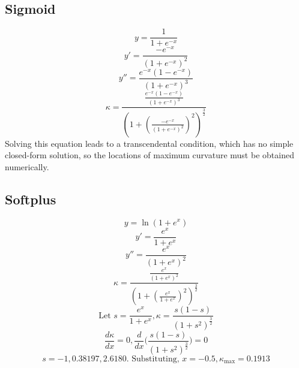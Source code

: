 \documentclass{article}
\begin{document}
\subsection{Sigmoid}\label{app:sigmoid}

\begin{displaymath}
  y = \frac{1}{1 + e^{-x}}
\end{displaymath}
\begin{displaymath}
  y' = \frac{-e^{-x}}{(1 + e^{-x})^2}
\end{displaymath}
\begin{displaymath}
  y'' = \frac{e^{-x}(1 - e^{-x})}{(1 + e^{-x})^3}
\end{displaymath}
\begin{displaymath}
  \kappa = \frac{\frac{e^{-x}(1 - e^{-x})}{(1 + e^{-x})^3}}{(1 + ( \frac{-e^{-x}}{(1 + e^{-x})^2})^2)^\frac{3}{2}}
\end{displaymath}
Solving this equation leads to a transcendental condition, 
which has no simple closed-form solution, so the 
locations of maximum curvature must be obtained numerically.

\subsection{Softplus}\label{app:softplus}

\begin{displaymath}
  y = \ln{({1 + e^{x}})}
\end{displaymath}
\begin{displaymath}
  y' = \frac{e^x}{1 + e^x}
\end{displaymath}
\begin{displaymath}
  y'' = \frac{e^{x}}{(1 + e^{x})^2}
\end{displaymath}
\begin{displaymath}
  \kappa = \frac{\frac{e^{x}}{(1 + e^{x})^2}}{(1 + (\frac{e^x}{1 + e^x})^2)^\frac{3}{2}}
\end{displaymath}
\begin{displaymath}
  \text{Let }s = \frac{e^x}{1 + e^x}, \kappa = \frac{s(1 - s)}{(1 + s^2)^\frac{3}{2}}
\end{displaymath}
\begin{displaymath}
  \frac{d\kappa}{dx} = 0, \frac{d}{dx}\bigg(\frac{s(1 - s)}{(1 + s^2)^\frac{3}{2}}\bigg) = 0
\end{displaymath}
\begin{displaymath}
  s = -1, 0.38197, 2.6180 \text{. Substituting, }x = -0.5, \kappa_{\text{max}} = 0.1913
\end{displaymath}
\end{document}
